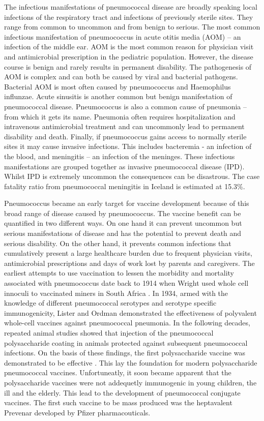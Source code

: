 \documentclass[]{book}
\theoremstyle{definition}
\theoremstyle{definition}
\theoremstyle{definition}
\theoremstyle{remark}
\begin{document}
The infectious manifestations of pneumococcal disease are broadly
speaking local infections of the respiratory tract and infections of
previously sterile sites. They range from common to uncommon and from
benign to serious. The most common infectious manifestation of
pneumococcus in acute otitis media (AOM) -- an infection of the middle
ear. AOM is the most common reason for physician visit and antimicrobial
prescription in the pediatric population. However, the disease course is
benign and rarely results in permanent disability. The pathogenesis of
AOM is complex and can both be caused by viral and bacterial pathogens.
Bacterial AOM is most often caused by pneumococcus and Haemophilus
influnzae. Acute sinusitis is another common but benign manifestation of
pneumococcal disease. Pneumococcus is also a common cause of pneumonia
-- from which it gets its name. Pneumonia often requires hospitalization
and intravenous antimicrobial treatment and can uncommonly lead to
permanent disability and death. Finally, if pneumococcus gains access to
normally sterile sites it may cause invasive infections. This includes
bacteremia - an infection of the blood, and meningitis -- an infection
of the meninges. These infectious manifestations are grouped together as
invasive pneumococcal disease (IPD). Whilst IPD is extremely uncommon
the consequences can be disastrous. The case fatality ratio from
pneumococcal meningitis in Iceland is estimated at 15.3\%.

Pneumococcus became an early target for vaccine development because of
this broad range of disease caused by pneumococcus. The vaccine benefit
can be quantified in two different ways. On one hand it can prevent
uncommon but serious manifestations of disease and has the potential to
prevent death and serious disability. On the other hand, it prevents
common infections that cumulatively present a large healthcare burden
due to frequent physician visits, antimicrobial prescriptions and days
of work lost by parents and caregivers. The earliest attempts to use
vaccination to lessen the morbidity and mortality associated with
pneumococcus date back to 1914 when Wright used whole cell innoculi to
vaccinated miners in South Africa \citep{Wright1914}. In 1934, armed
with the knowledge of different pneumococcal serotypes and serotype
specific immunogenicity, Lister and Ordman demonstrated the
effectiveness of polyvalent whole-cell vaccines against pneumococcal
pneumonia. In the following decades, repeated animal studies showed that
injection of the pneumococcal polysaccharide coating in animals
protected against subsequent pneumococcal infections. On the basis of
these findings, the first polysaccharide vaccine was demonstrated to be
effective \citep{Macleod1945}. This lay the foundation for modern
polysaccharide pneumococcal vaccines. Unfortuneatly, it soon became
apparent that the polysaccharide vaccines were not addequetly
immunogenic in young children, the ill and the elderly. This lead to the
development of pneumococcal conjugate vaccines. The first such vaccine
to be mass produced was the heptavalent Prevenar developed by Pfizer
pharmacouticals.
\end{document}
